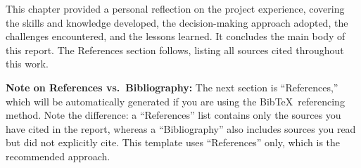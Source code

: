 This chapter provided a personal reflection on the project experience, covering 
the skills and knowledge developed, the decision-making approach adopted, the 
challenges encountered, and the lessons learned. It concludes the main body 
of this report. The References section follows, listing all sources cited 
throughout this work.

\bigskip
\noindent\textbf{Note on References vs.\ Bibliography:} The next section is 
``References,'' which will be automatically generated if you are using the 
Bib\TeX\ referencing method. Note the difference: a ``References'' list 
contains only the sources you have cited in the report, whereas a 
``Bibliography'' also includes sources you read but did not explicitly cite. 
This template uses ``References'' only, which is the recommended approach.
